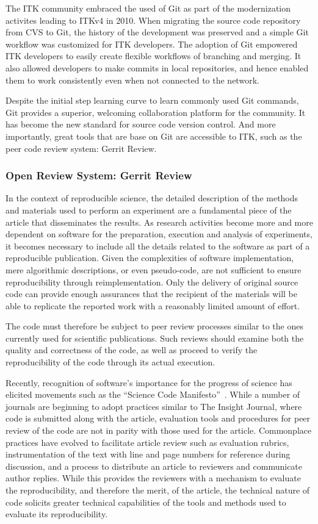 \documentclass{frontiersENG} %
\begin{document}
The ITK community embraced the used of Git as part of the modernization activites
leading to ITKv4 in 2010.  When migrating the source code repository from CVS
to Git, the history of the development was preserved and a simple Git workflow
was customized for ITK developers.  The adoption of Git empowered ITK
developers to easily create flexible workflows of branching and merging. It
also allowed developers to make commits in local repositories, and hence
enabled them to work consistently even when not connected to the network.

Despite the initial step learning curve to learn commonly used Git commands,
Git provides a superior, welcoming collaboration platform for the community. It
has become the new standard for source code version control.  And more
importantly, great tools that are base on Git are accessible to ITK, such as
the peer code review system: Gerrit Review.


\subsubsection{Open Review System: Gerrit Review}

In the context of
reproducible science, the detailed description of the methods and materials
used to perform an experiment are a fundamental piece of the article that
disseminates the results. As research activities become more and more dependent
on software for the preparation, execution and analysis of experiments, it
becomes necessary to include all the details related to the software as part of
a reproducible publication. Given the complexities of software implementation,
mere algorithmic descriptions, or even pseudo-code, are not sufficient to ensure
reproducibility through reimplementation. Only the delivery of original source
code can provide enough assurances that the recipient of the materials will be
able to replicate the reported work with a reasonably limited amount of effort.

The code must therefore be subject to peer review processes similar to the ones
currently used for scientific publications. Such reviews should examine both
the quality and correctness of the code, as well as proceed to verify the
reproducibility of the code through its actual execution.

Recently, recognition of software's importance for the progress of science has
elicited movements such as the ``Science Code Manifesto''~\cite{Barnes2011}.
While a number of journals are beginning to adopt practices similar to The
Insight Journal, where code is submitted along with the article, evaluation
tools and procedures for peer review of the code are not in parity with those
used for the article. Commonplace practices have evolved to facilitate article
review such as evaluation rubrics, instrumentation of the text with line and
page numbers for reference during discussion, and a process to distribute an
article to reviewers and communicate author replies.  While this provides the
reviewers with a mechanism to evaluate the reproducibility, and therefore the
merit, of the article, the technical nature of code solicits greater technical
capabilities of the tools and methods used to evaluate its reproducibility.
\end{document}
